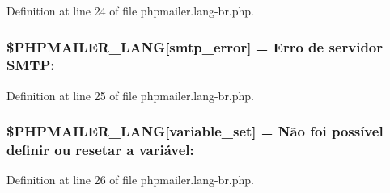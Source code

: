 Definition at line 24 of file phpmailer.\+lang-\/br.\+php.

\subsubsection[{\texorpdfstring{\$\+P\+H\+P\+M\+A\+I\+L\+E\+R\+\_\+\+L\+A\+NG}{$PHPMAILER_LANG}}]{\setlength{\rightskip}{0pt plus 5cm}\$P\+H\+P\+M\+A\+I\+L\+E\+R\+\_\+\+L\+A\+NG\mbox{[}\textquotesingle{}smtp\+\_\+error\textquotesingle{}\mbox{]} = \textquotesingle{}Erro de servidor S\+M\+T\+P\+: \textquotesingle{}}\hypertarget{phpmailer_8lang-br_8php_a7d9cffba1e669c845f8a4c891ee50064}{}\label{phpmailer_8lang-br_8php_a7d9cffba1e669c845f8a4c891ee50064}


Definition at line 25 of file phpmailer.\+lang-\/br.\+php.

\subsubsection[{\texorpdfstring{\$\+P\+H\+P\+M\+A\+I\+L\+E\+R\+\_\+\+L\+A\+NG}{$PHPMAILER_LANG}}]{\setlength{\rightskip}{0pt plus 5cm}\$P\+H\+P\+M\+A\+I\+L\+E\+R\+\_\+\+L\+A\+NG\mbox{[}\textquotesingle{}variable\+\_\+set\textquotesingle{}\mbox{]} = \textquotesingle{}Não foi possível definir ou resetar {\bf a} variável\+: \textquotesingle{}}\hypertarget{phpmailer_8lang-br_8php_af795debc7a739d038742691c358d9032}{}\label{phpmailer_8lang-br_8php_af795debc7a739d038742691c358d9032}


Definition at line 26 of file phpmailer.\+lang-\/br.\+php.

